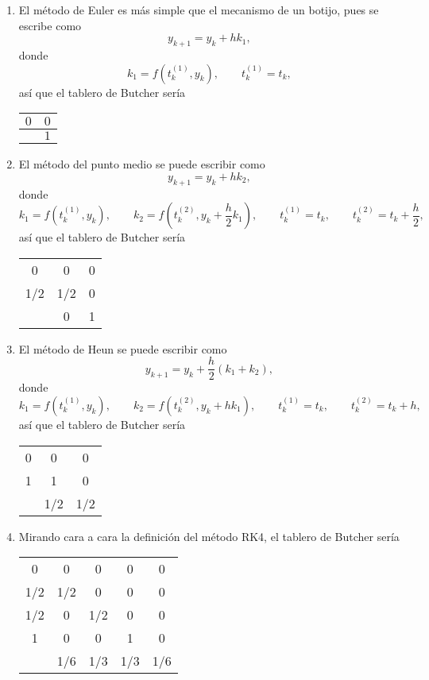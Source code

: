 \documentclass[11pt]{report}
\theoremstyle{mytheorem}
\theoremstyle{mydefinition}
\theoremstyle{myexample}
\begin{document}
\begin{enumerate}
    \item El método de Euler es más simple que el mecanismo de un botijo, pues se escribe como
\[y_{k+1} = y_k+hk_1,\]
donde
\[k_1 = f(t_k^{(1)},y_k), \qquad t_k^{(1)} = t_k,\]
así que el tablero de Butcher sería
\begin{center}
\setlength\extrarowheight{2.5pt}
\begin{tabular}{c|c}
    $0$ & $0$ \\ \hline
    & $1$
\end{tabular}
\end{center}

\item El método del punto medio se puede escribir como
\[y_{k+1} = y_k+hk_2,\]
donde
\[k_1 = f(t_k^{(1)},y_k), \qquad k_2 = f(t_k^{(2)},y_k+\frac{h}{2}k_1), \qquad t_k^{(1)}=t_k, \qquad t_k^{(2)} = t_k+\frac{h}{2},\]
así que el tablero de Butcher sería

\begin{center}
\setlength\extrarowheight{2.5pt}
\begin{tabular}{c|cc}
    0 & 0 & 0 \\
    1/2 & 1/2 & 0 \\ \hline
    & 0 & 1
\end{tabular}
\end{center}

\item El método de Heun se puede escribir como
\[y_{k+1} = y_k+\frac{h}{2}(k_1+k_2),\]
donde
\[k_1=f(t_k^{(1)},y_k), \qquad k_2 = f(t_k^{(2)},y_k+hk_1), \qquad t_k^{(1)} = t_k, \qquad t_k^{(2)} = t_k+h,\]
así que el tablero de Butcher sería

\begin{center}
\setlength\extrarowheight{2.5pt}
\begin{tabular}{c|cc}
    0 & 0 & 0 \\
    1 & 1 & 0 \\ \hline
    & 1/2 & 1/2
\end{tabular}
\end{center}

\item Mirando cara a cara la definición del método RK4, el tablero de Butcher sería

\begin{center}
\setlength\extrarowheight{2.5pt}
\begin{tabular}{c|cccc}
    0 & 0 & 0 & 0 & 0 \\
    1/2 & 1/2 & 0 & 0 & 0 \\
    1/2 & 0 & 1/2 & 0 & 0 \\
    1 & 0 & 0 & 1 & 0 \\ \hline
    & 1/6 & 1/3 & 1/3 & 1/6
\end{tabular}
\end{center}

\end{enumerate}
\end{document}
